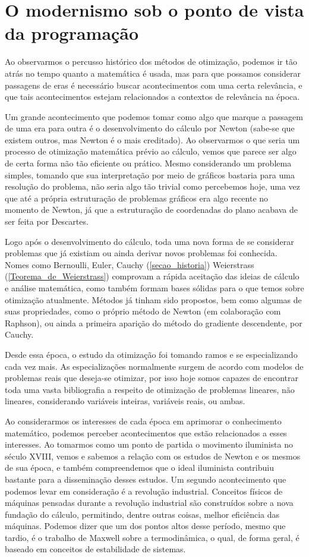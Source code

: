 \section{O modernismo sob o ponto de vista da programação}
Ao observarmos o percusso histórico dos métodos de otimização, podemos ir tão atrás no tempo
quanto a matemática é usada, mas para que possamos considerar passagens de eras é necessário
buscar acontecimentos com uma certa relevância, e que tais acontecimentos estejam relacionados
a contextos de relevância na época.

Um grande acontecimento que podemos tomar como algo que marque a passagem de uma era para
outra é o desenvolvimento do cálculo por Newton (sabe-se que existem outros, mas Newton é
o mais creditado). Ao observarmos o que seria um processo de otimização matemática prévio
ao cálculo, vemos que parece ser algo de certa forma não tão eficiente ou prático. Mesmo
considerando um problema simples, tomando que sua interpretação por meio de gráficos bastaria
para uma resolução do problema, não seria algo tão trivial como percebemos hoje, uma vez
que até a própria estruturação de problemas gráficos era algo recente no momento de Newton,
já que a estruturação de coordenadas do plano acabava de ser feita por Descartes.

Logo após o desenvolvimento do cálculo, toda uma nova forma de se considerar problemas
que já existiam ou ainda derivar novos problemas foi conhecida. Nomes como Bernoulli, Euler,
Cauchy (\ref{secao_historia}) Weierstrass (\ref{Teorema_de_Weierstrass}) comprovam a rápida
aceitação das ideias de cálculo e análise matemática, como também formam bases sólidas para
o que temos sobre otimização atualmente. Métodos já tinham sido propostos, bem como algumas
de suas propriedades, como o próprio método de Newton (em colaboração com Raphson), ou ainda
a primeira aparição do método do gradiente descendente, por Cauchy.

Desde essa época, o estudo da otimização foi tomando ramos e se especializando cada vez mais.
As especializações normalmente surgem de acordo com modelos de problemas reais que deseja-se
otimizar, por isso hoje somos capazes de encontrar toda uma vasta bibliografia a respeito de
otimização de problemas lineares, não lineares, considerando variáveis inteiras, variáveis
reais, ou ambas.

Ao considerarmos os interesses de cada época em aprimorar o conhecimento matemático, podemos
perceber acontecimentos que estão relacionados a esses interesses. Ao tomarmos como um ponto
de partida o movimento iluminista no século XVIII, vemos e sabemos a relação com os estudos
de Newton e os mesmos de sua época, e também compreendemos que o ideal iluminista contribuiu
bastante para a disseminação desses estudos. Um segundo acontecimento que podemos levar em
consideração é a revolução industrial. Conceitos físicos de máquinas pensadas durante a
revolução industrial são construídos sobre a nova fundação do cálculo, permitindo, dentre
outras coisas, melhor eficiência das máquinas. Podemos dizer que um dos pontos altos desse
período, mesmo que tardio, é o trabalho de Maxwell sobre a termodinâmica, o qual, de forma
geral, é baseado em conceitos de estabilidade de sistemas.



